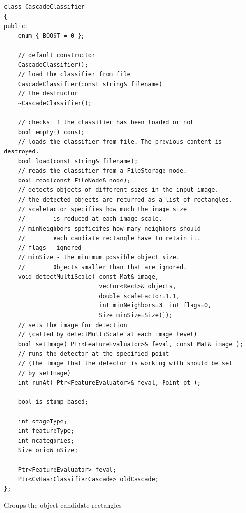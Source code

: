 \begin{lstlisting}
class CascadeClassifier
{
public:    
    enum { BOOST = 0 };

    // default constructor
    CascadeClassifier();
    // load the classifier from file
    CascadeClassifier(const string& filename);
    // the destructor
    ~CascadeClassifier();
    
    // checks if the classifier has been loaded or not
    bool empty() const;
    // loads the classifier from file. The previous content is destroyed.
    bool load(const string& filename);
    // reads the classifier from a FileStorage node.
    bool read(const FileNode& node);
    // detects objects of different sizes in the input image.
    // the detected objects are returned as a list of rectangles.
    // scaleFactor specifies how much the image size
    //        is reduced at each image scale.
    // minNeighbors speficifes how many neighbors should
    //        each candiate rectangle have to retain it.
    // flags - ignored
    // minSize - the minimum possible object size.
    //        Objects smaller than that are ignored.
    void detectMultiScale( const Mat& image,
                           vector<Rect>& objects,
                           double scaleFactor=1.1,
                           int minNeighbors=3, int flags=0,
                           Size minSize=Size());
    // sets the image for detection
    // (called by detectMultiScale at each image level)
    bool setImage( Ptr<FeatureEvaluator>& feval, const Mat& image );
    // runs the detector at the specified point
    // (the image that the detector is working with should be set
    // by setImage)
    int runAt( Ptr<FeatureEvaluator>& feval, Point pt );

    bool is_stump_based;

    int stageType;
    int featureType;
    int ncategories;
    Size origWinSize;

    Ptr<FeatureEvaluator> feval;
    Ptr<CvHaarClassifierCascade> oldCascade;
};
\end{lstlisting}

Groups the object candidate rectangles

\begin{description}
\end{description}

